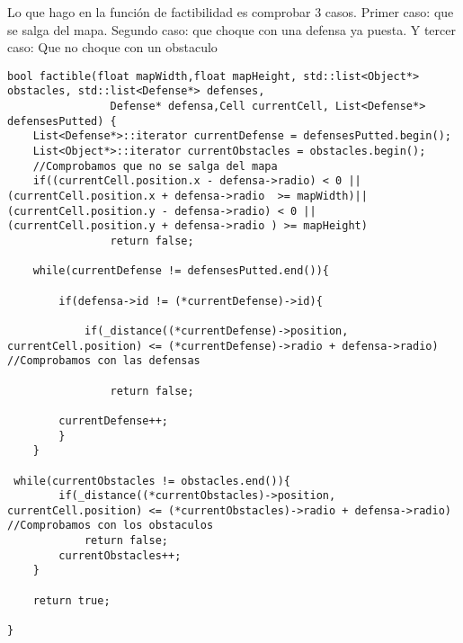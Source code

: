 Lo que hago en la función de factibilidad es comprobar 3 casos. Primer caso: que se salga del mapa. Segundo caso: que choque con una defensa ya puesta. Y tercer caso: Que no choque con un obstaculo

\begin{lstlisting}
bool factible(float mapWidth,float mapHeight, std::list<Object*> obstacles, std::list<Defense*> defenses,
                Defense* defensa,Cell currentCell, List<Defense*> defensesPutted) {
	List<Defense*>::iterator currentDefense = defensesPutted.begin();
	List<Object*>::iterator currentObstacles = obstacles.begin();
	//Comprobamos que no se salga del mapa
	if((currentCell.position.x - defensa->radio) < 0 || (currentCell.position.x + defensa->radio  >= mapWidth)||(currentCell.position.y - defensa->radio) < 0 || (currentCell.position.y + defensa->radio ) >= mapHeight)
				return false;

	while(currentDefense != defensesPutted.end()){

		if(defensa->id != (*currentDefense)->id){

			if(_distance((*currentDefense)->position, currentCell.position) <= (*currentDefense)->radio + defensa->radio) //Comprobamos con las defensas

				return false;

		currentDefense++;
		}
	}

 while(currentObstacles != obstacles.end()){
		if(_distance((*currentObstacles)->position, currentCell.position) <= (*currentObstacles)->radio + defensa->radio) //Comprobamos con los obstaculos
			return false;
		currentObstacles++;
	}

	return true;
	
}
\end{lstlisting}
